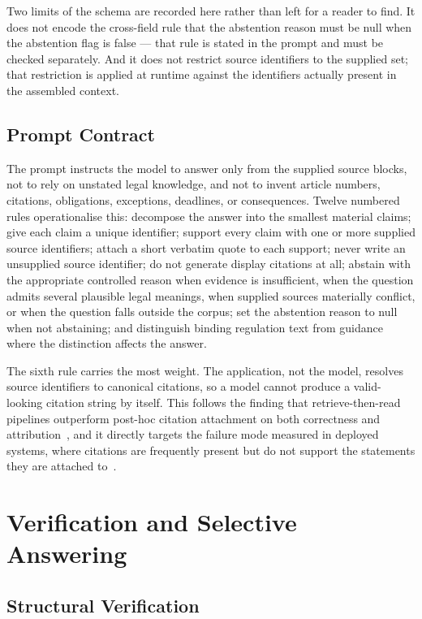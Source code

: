 Two limits of the schema are recorded here rather than left for a reader to find. It does not encode the cross-field rule that the abstention reason must be null when the abstention flag is false --- that rule is stated in the prompt and must be checked separately. And it does not restrict source identifiers to the supplied set; that restriction is applied at runtime against the identifiers actually present in the assembled context.

\subsection{Prompt Contract}

The prompt instructs the model to answer only from the supplied source blocks, not to rely on unstated legal knowledge, and not to invent article numbers, citations, obligations, exceptions, deadlines, or consequences. Twelve numbered rules operationalise this: decompose the answer into the smallest material claims; give each claim a unique identifier; support every claim with one or more supplied source identifiers; attach a short verbatim quote to each support; never write an unsupplied source identifier; do not generate display citations at all; abstain with the appropriate controlled reason when evidence is insufficient, when the question admits several plausible legal meanings, when supplied sources materially conflict, or when the question falls outside the corpus; set the abstention reason to null when not abstaining; and distinguish binding regulation text from guidance where the distinction affects the answer.

The sixth rule carries the most weight. The application, not the model, resolves source identifiers to canonical citations, so a model cannot produce a valid-looking citation string by itself. This follows the finding that retrieve-then-read pipelines outperform post-hoc citation attachment on both correctness and attribution~\cite{bohnet2022attributed}, and it directly targets the failure mode measured in deployed systems, where citations are frequently present but do not support the statements they are attached to~\cite{liu2023verifiability}.

\section{Verification and Selective Answering}
\label{sec:method-verify}

\subsection{Structural Verification}

